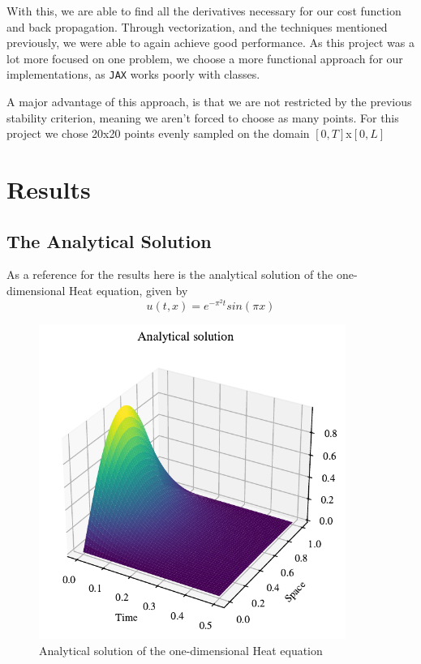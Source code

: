 \documentclass{article}
\theoremstyle{definition}
\begin{document}
With this, we are able to find all the derivatives necessary for our cost function and back propagation. Through vectorization, and the techniques mentioned previously, we were able to again achieve good performance. As this project was a lot more focused on one problem, we choose a more functional approach for our implementations, as \verb|JAX| works poorly with classes.

A major advantage of this approach, is that we are not restricted by the previous stability criterion, meaning we aren't forced to choose as many points. For this project we chose 20x20 points evenly sampled on the domain $[0,T]$x$[0, L]$

\newpage

\section{Results}

\subsection{The Analytical Solution}
As a reference for the results here is the analytical solution of the one-dimensional Heat equation, given by
\[
u(t,x) = e^{-\pi^2 t}sin(\pi x)
\]

\begin{figure}[H]%
    \centering
    \includegraphics[width=10cm]{Project3/figures/1dHeat/Analytical_sol.pdf}
    \caption{Analytical solution of the one-dimensional Heat equation }
    \label{fig:Analytic}
\end{figure}
\end{document}
